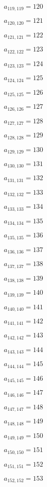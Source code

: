 \documentclass[a4paper,12pt]{article}
\begin{document}
$a _{ 119, 119 } = 120$

$a _{ 120, 120 } = 121$

$a _{ 121, 121 } = 122$

$a _{ 122, 122 } = 123$

$a _{ 123, 123 } = 124$

$a _{ 124, 124 } = 125$

$a _{ 125, 125 } = 126$

$a _{ 126, 126 } = 127$

$a _{ 127, 127 } = 128$

$a _{ 128, 128 } = 129$

$a _{ 129, 129 } = 130$

$a _{ 130, 130 } = 131$

$a _{ 131, 131 } = 132$

$a _{ 132, 132 } = 133$

$a _{ 133, 133 } = 134$

$a _{ 134, 134 } = 135$

$a _{ 135, 135 } = 136$

$a _{ 136, 136 } = 137$

$a _{ 137, 137 } = 138$

$a _{ 138, 138 } = 139$

$a _{ 139, 139 } = 140$

$a _{ 140, 140 } = 141$

$a _{ 141, 141 } = 142$

$a _{ 142, 142 } = 143$

$a _{ 143, 143 } = 144$

$a _{ 144, 144 } = 145$

$a _{ 145, 145 } = 146$

$a _{ 146, 146 } = 147$

$a _{ 147, 147 } = 148$

$a _{ 148, 148 } = 149$

$a _{ 149, 149 } = 150$

$a _{ 150, 150 } = 151$

$a _{ 151, 151 } = 152$

$a _{ 152, 152 } = 153$
\end{document}
